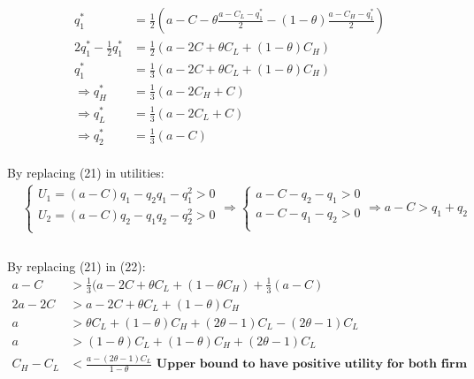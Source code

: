 \documentclass[
  course = {{IE579 Game Theory and Multi-Agent Reinforcement Learning}},
  quartile = {{4}},
  assignment = 2,
  name = {{Mohammad Mahdi Rahimi}},
  studentnumber = {{20208244}},
  email = {{mahi@kaist.ac.kr}},
  firstexercise = 1
]{aga-homework}
\begin{document}
\begin{equation}
    \begin{split}
        q^*_1 & =  \frac{1}{2}(a - C - \theta \frac{a - C_L - q^*_1}{2} - (1 - \theta) \frac{a - C_H - q^*_1}{2})\\
        2q^*_1 - \frac{1}{2}q^*_1 & = \frac{1}{2}(a - 2C + \theta C_L + (1 - \theta) C_H)\\
        q^*_1 & = \frac{1}{3}(a - 2C + \theta C_L + (1 - \theta) C_H)\\
        \Rightarrow q^*_H & =  \frac{1}{3}(a - 2C_H + C)\\
        \Rightarrow q^*_L & =  \frac{1}{3}(a - 2C_L + C)\\
        \Rightarrow q^*_2 & =  \frac{1}{3}(a - C)
    \end{split}
\end{equation}\\
By replacing (21) in utilities:
\begin{equation}
    \begin{split}
        & \begin{cases}
        U_1 = (a - C)q_1 - q_2q_1 - q^2_1 > 0\\
        U_2 = (a - C)q_2 - q_1q_2 - q^2_2 > 0\\
        \end{cases} \Rightarrow \begin{cases}
        a - C - q_2 - q_1 > 0\\
        a - C - q_1 - q_2 > 0\\
        \end{cases} \Rightarrow a - C > q_1 + q_2\\
    \end{split}
\end{equation}\\
By replacing (21) in (22):
\begin{equation}
    \begin{split}
        a - C & > \frac{1}{3}(a - 2C + \theta C_L + (1 - \theta C_H) + \frac{1}{3}(a - C)\\
        2a - 2C & > a - 2C + \theta C_L + (1 - \theta) C_H\\
        a & > \theta C_L + (1 - \theta) C_H + (2\theta - 1)C_L - (2\theta - 1)C_L\\
        a & > (1 - \theta) C_L + (1 - \theta) C_H + (2\theta - 1)C_L \\
        C_H - C_L & < \frac{a - (2\theta - 1)C_L}{1 - \theta} \textbf{ Upper bound to have positive utility for both firm }
    \end{split}
\end{equation}
\end{document}
